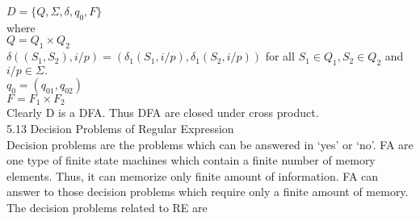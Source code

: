 \documentclass{article}
\begin{document}
\vspace*{0.3cm}
\hspace*{4cm} $D = \{Q, \Sigma , \delta , q_0, F\}$ \\

where\\

\hspace*{4cm} $Q = Q_1 \times Q_2$ \\
\small{
\hspace*{0.5cm} $\delta((S_1, S_2), i/p) = (\delta_1(S_1, i/p), \delta_1(S_2, i/p))$ for all $S_1 \in Q_1, S_2 \in Q_2$ and $i/p \in \Sigma.$ }\\


\hspace*{4cm} $q_0 = (q_01, q_02)$ \\
\hspace*{4cm} $F = F_1 \times F_2$ \\

\vspace*{0.3cm}
Clearly D is a DFA. Thus DFA are closed under cross product.\\

\vspace*{0.4cm}
5.13 Decision Problems of Regular Expression\\

\vspace*{0.3cm}
Decision problems are the problems which can be answered in ‘yes’ or ‘no’. FA are one type of finite state
machines which contain a finite number of memory elements. Thus, it can memorize only finite amount
of information. FA can answer to those decision problems which require only a finite amount of memory.\\
\hspace*{0.5cm} The decision problems related to RE are\\

\vspace*{0.3cm}
\end{document}
